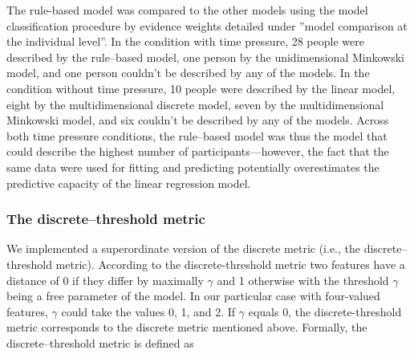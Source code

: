 \documentclass[a4paper,man,natbib]{apa6}
\begin{document}
The rule-based model was compared to the other models using the model classification procedure by evidence weights detailed under ''model comparison at the individual level''. In the condition with time pressure, 28 people were described by the rule--based model, one person by the unidimensional Minkowski model, and one person couldn't be described by any of the models. In the condition without time pressure, 10 people were described by the linear model, eight by the multidimensional discrete model, seven by the multidimensional Minkowski model, and six couldn't be described by any of the models. Across both time pressure conditions, the rule--based model was thus the model that could describe the highest number of participants---however, the fact that the same data were used for fitting and predicting potentially overestimates the predictive capacity of the linear regression model. 

\subsubsection{The discrete--threshold metric}
We implemented a superordinate version of the discrete metric (i.e., the discrete--threshold metric). According to the discrete-threshold metric two features have a distance of 0 if they differ by maximally $\gamma$ and 1 otherwise with the threshold $\gamma$ being a free parameter of the model. In our particular case with four-valued features, $\gamma$ could take the values 0, 1, and 2. If $\gamma$ equals 0, the discrete-threshold metric corresponds to the discrete metric mentioned above. Formally, the discrete--threshold metric is defined as
\end{document}
